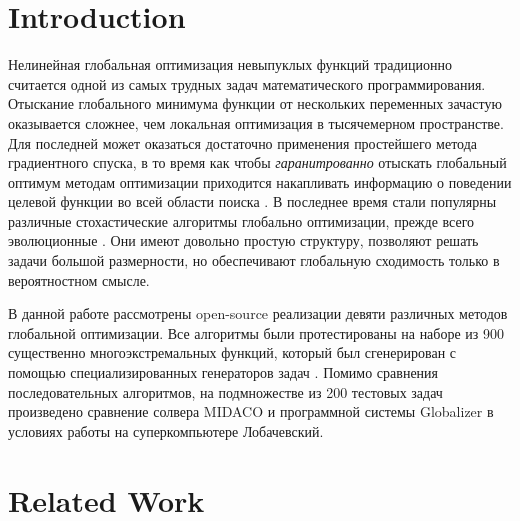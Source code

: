 \documentclass{svproc}
\begin{document}
\section{Introduction}
Нелинейная глобальная оптимизация невыпуклых функций традиционно считается одной из самых трудных
задач математического программирования. Отыскание глобального минимума функции от нескольких переменных
зачастую оказывается сложнее, чем локальная оптимизация в тысячемерном пространстве. Для последней может оказаться достаточно
применения простейшего метода градиентного спуска, в то время как чтобы \textit{гаранитрованно} отыскать глобальный оптимум методам
оптимизации приходится накапливать информацию о поведении целевой функции во всей области поиска \cite{Jones2009,Paulavicius2011,Evtushenko2013,strSergGO}. В последнее время стали популярны
различные стохастические алгоритмы глобально оптимизации, прежде всего эволюционные \cite{Storn1997, SCHLUTER2009, KennedyEberhart1995}. Они имеют довольно простую структуру, позволяют решать задачи большой размерности, но обеспечивают глобальную сходимость только в вероятностном смысле.

В данной работе рассмотрены open-source реализации девяти различных методов глобальной оптимизации.
Все алгоритмы были протестированы на наборе из 900 существенно многоэкстремальных функций, который был сгенерирован с
помощью специализированных генераторов задач \cite{Gaviano2003, grishaginClass}. Помимо сравнения последовательных алгоритмов, на подмножестве из 200 тестовых задач произведено сравнение солвера MIDACO \cite{Schlueter2012} и программной системы Globalizer \cite{globalizerSystem} в условиях работы на суперкомпьютере Лобачевский.

\section{Related Work}
\end{document}

